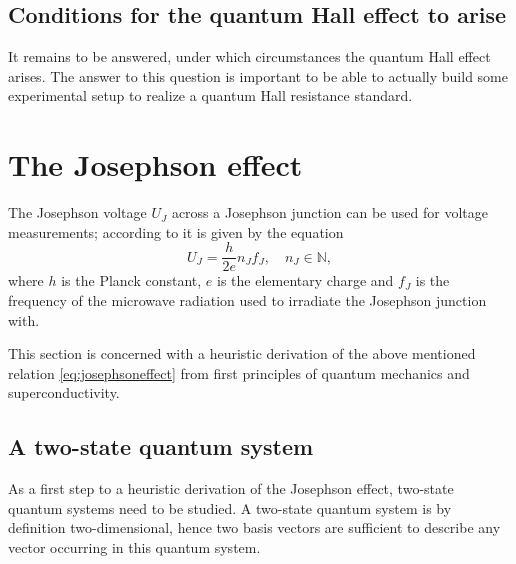 \documentclass{report}
\numberwithin{tm}{section}
\begin{document}
\subsection{Conditions for the quantum Hall effect to arise}
It remains to be answered, under which circumstances the quantum Hall effect arises. The answer to this question is important to be able to actually build some experimental setup to realize a quantum Hall resistance standard.




	
\section{The Josephson effect}
	The Josephson voltage $U_J$ across a Josephson junction can be used for voltage measurements; according to \cite{Kajastie_2009} it is given by the equation \begin{equation}\label{eq:josephsoneffect}
		U_J = \frac{h}{2e}n_Jf_J, \quad n_J \in \mathbb{N},
	\end{equation} where $h$ is the Planck constant, $e$ is the elementary charge and $f_J$ is the frequency of the microwave radiation used to irradiate the Josephson junction with.
	
	This section is concerned with a heuristic derivation of the above mentioned relation \cref{eq:josephsoneffect} from first principles of quantum mechanics and superconductivity.

\subsection{A two-state quantum system}
As a first step to a heuristic derivation of the Josephson effect, two-state quantum systems need to be studied. A two-state quantum system is by definition two-dimensional, hence two basis vectors are sufficient to describe any vector occurring in this quantum system. 
\end{document}
